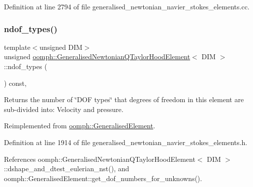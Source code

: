 Definition at line 2794 of file generalised\+\_\+newtonian\+\_\+navier\+\_\+stokes\+\_\+elements.\+cc.

\mbox{\label{classoomph_1_1GeneralisedNewtonianQTaylorHoodElement_a526d20c2aaa5f0ba68436a06de012443}} 
\subsubsection{\texorpdfstring{ndof\+\_\+types()}{ndof\_types()}}
{\footnotesize\ttfamily template$<$unsigned D\+IM$>$ \\
unsigned \hyperlink{classoomph_1_1GeneralisedNewtonianQTaylorHoodElement}{oomph\+::\+Generalised\+Newtonian\+Q\+Taylor\+Hood\+Element}$<$ D\+IM $>$\+::ndof\+\_\+types (\begin{DoxyParamCaption}{ }\end{DoxyParamCaption}) const\hspace{0.3cm}{\ttfamily [inline]}, {\ttfamily [virtual]}}



Returns the number of \char`\"{}\+D\+O\+F types\char`\"{} that degrees of freedom in this element are sub-\/divided into\+: Velocity and pressure. 



Reimplemented from \hyperlink{classoomph_1_1GeneralisedElement_a0c6037a870597b35dcf1c780710b9a56}{oomph\+::\+Generalised\+Element}.



Definition at line 1914 of file generalised\+\_\+newtonian\+\_\+navier\+\_\+stokes\+\_\+elements.\+h.



References oomph\+::\+Generalised\+Newtonian\+Q\+Taylor\+Hood\+Element$<$ D\+I\+M $>$\+::dshape\+\_\+and\+\_\+dtest\+\_\+eulerian\+\_\+nst(), and oomph\+::\+Generalised\+Element\+::get\+\_\+dof\+\_\+numbers\+\_\+for\+\_\+unknowns().

\mbox{\label{classoomph_1_1GeneralisedNewtonianQTaylorHoodElement_ab52245df561c368a6f0709374dba7136}} 
